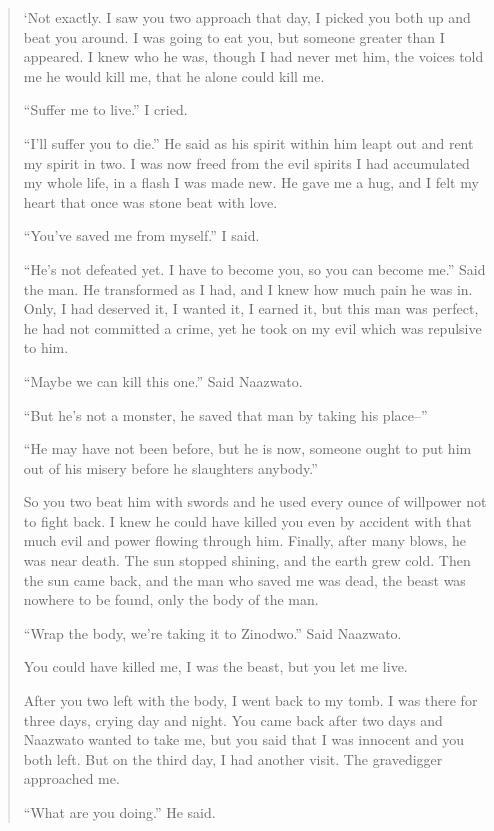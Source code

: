 \begin{quote}
`Not exactly. I saw you two approach that day, I picked you both up and beat you around. I was going to eat you, but someone greater than I appeared. I knew who he was, though I had never met him, the voices told me he would kill me, that he alone could kill me.

``Suffer me to live.'' I cried.

``I'll suffer you to die.'' He said as his spirit within him leapt out and rent my spirit in two. I was now freed from the evil spirits I had accumulated my whole life, in a flash I was made new. He gave me a hug, and I felt my heart that once was stone beat with love.

``You've saved me from myself.'' I said.

``He's not defeated yet. I have to become you, so you can become me.'' Said the man.
He transformed as I had, and I knew how much pain he was in.
Only, I had deserved it, I wanted it, I earned it, but this man was perfect, he had not committed a crime, yet he took on my evil which was repulsive to him.

``Maybe we can kill this one.'' Said Naa\-zwa\-to.

``But he's not a monster, he saved that man by taking his place--''

``He may have not been before, but he is now, someone ought to put him out of his misery before he slaughters anybody.''

So you two beat him with swords and he used every ounce of willpower not to fight back.
I knew he could have killed you even by accident with that much evil and power flowing through him.
Finally, after many blows, he was near death.
The sun stopped shining, and the earth grew cold.
Then the sun came back, and the man who saved me was dead, the beast was nowhere to be found, only the body of the man.

``Wrap the body, we're taking it to Zi\-no\-dwo.'' Said Naa\-zwa\-to.

You could have killed me, I was the beast, but you let me live.

After you two left with the body, I went back to my tomb.
I was there for three days, crying day and night.
You came back after two days and Naa\-zwa\-to wanted to take me, but you said that I was innocent and you both left. But on the third day, I had another visit.
The gravedigger approached me.

``What are you doing.'' He said.


\end{quote}
